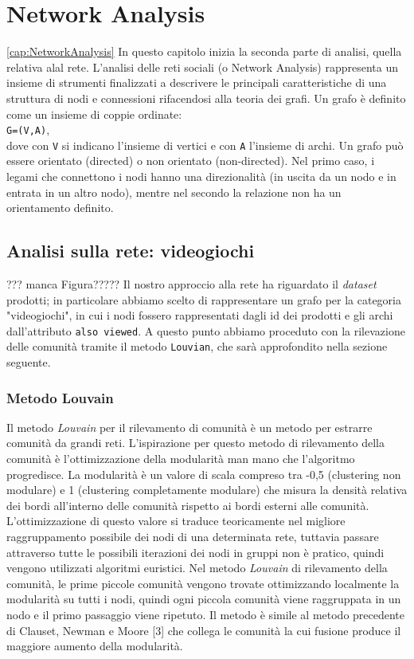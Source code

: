 \chapter{Network Analysis}
\ref{cap:NetworkAnalysis}
	In questo capitolo inizia la seconda parte di analisi, quella relativa alal rete. L’analisi delle reti sociali (o Network Analysis) rappresenta un insieme di strumenti finalizzati
	a descrivere le principali caratteristiche di una struttura di nodi e connessioni rifacendosi alla teoria dei grafi. Un grafo è definito come un insieme di coppie ordinate: \\
	\verb|G=(V,A)|, \\
	dove con \verb|V| si indicano l'insieme di vertici e con \verb|A| l'insieme di archi.	Un grafo può essere orientato (directed) o non orientato (non-directed). Nel primo caso, i	legami che connettono i nodi hanno una direzionalità (in uscita da un nodo e in entrata in un altro nodo), mentre nel secondo la relazione non ha un orientamento definito. 
	
	
	\section{Analisi sulla rete: videogiochi}
		??? manca Figura?????
		Il nostro approccio alla rete ha riguardato il \textit{dataset} prodotti; in particolare abbiamo scelto di rappresentare un grafo per la categoria "videogiochi", in cui i nodi fossero rappresentati dagli id dei prodotti e gli archi dall'attributo \verb|also viewed|.	A questo punto abbiamo proceduto con la rilevazione delle comunità tramite il metodo \verb|Louvian|, che sarà approfondito nella sezione seguente.
		
		\subsection{Metodo Louvain}
			Il metodo \textit{Louvain} per il rilevamento di comunità è un metodo per estrarre comunità da grandi reti. L'ispirazione per questo metodo di rilevamento della comunità è l'ottimizzazione della modularità man mano che l'algoritmo progredisce. La modularità è un valore di scala compreso tra -0,5 (clustering non modulare) e 1 (clustering completamente modulare) che misura la densità relativa dei bordi all'interno delle comunità rispetto ai bordi esterni alle comunità. L'ottimizzazione di questo valore si traduce teoricamente nel migliore raggruppamento possibile dei nodi di una determinata rete, tuttavia passare attraverso tutte le possibili iterazioni dei nodi in gruppi non è pratico, quindi vengono utilizzati algoritmi euristici. Nel metodo \textit{Louvain} di rilevamento della comunità, le prime piccole comunità vengono trovate ottimizzando localmente la modularità su tutti i nodi, quindi ogni piccola comunità viene raggruppata in un nodo e il primo passaggio viene ripetuto. Il metodo è simile al metodo precedente di Clauset, Newman e Moore [3] che collega le comunità la cui fusione produce il maggiore aumento della modularità.
		
